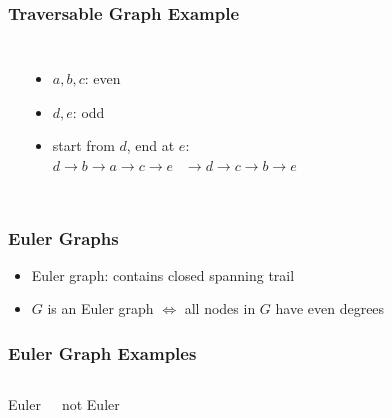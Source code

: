 \documentclass[dvipsnames]{beamer}
\begin{document}
\begin{frame}
  \frametitle{Traversable Graph Example}

  \begin{columns}
    \begin{center}
    \end{center}

    \begin{itemize}
      \item $a,b,c$: even
      \item $d,e$: odd

      \medskip
      \item start from $d$, end at $e$:\\
        $d \rightarrow b \rightarrow a \rightarrow c \rightarrow e$
        $~~\rightarrow d \rightarrow c \rightarrow b \rightarrow e$
    \end{itemize}
  \end{columns}
\end{frame}

\begin{frame}
  \frametitle{Euler Graphs}

  \begin{itemize}
    \item \alert{Euler graph}: contains closed spanning trail
  \end{itemize}

  \begin{itemize}
    \item $G$ is an Euler graph $\Leftrightarrow$
      all nodes in $G$ have even degrees
  \end{itemize}
\end{frame}

\begin{frame}
  \frametitle{Euler Graph Examples}

  \begin{columns}
    \begin{center}
      Euler

      \bigskip
    \end{center}

    \begin{center}
      not Euler

      \bigskip
    \end{center}
  \end{columns}
\end{frame}
\end{document}

